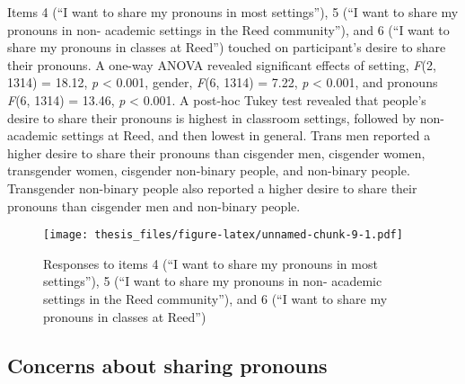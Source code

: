 \documentclass[12pt,twoside]{reedthesis}
\begin{document}
Items 4 (``I want to share my pronouns in most settings''), 5 (``I want to share my pronouns in non- academic settings in the Reed community''), and 6 (``I want to share my pronouns in classes at Reed'') touched on participant's desire to share their pronouns. A one-way ANOVA revealed significant effects of setting, \emph{F}(2, 1314) = 18.12, \emph{p} \textless{} 0.001, gender, \emph{F}(6, 1314) = 7.22, \emph{p} \textless{} 0.001, and pronouns \emph{F}(6, 1314) = 13.46, \emph{p} \textless{} 0.001. A post-hoc Tukey test revealed that people's desire to share their pronouns is highest in classroom settings, followed by non-academic settings at Reed, and then lowest in general. Trans men reported a higher desire to share their pronouns than cisgender men, cisgender women, transgender women, cisgender non-binary people, and non-binary people. Transgender non-binary people also reported a higher desire to share their pronouns than cisgender men and non-binary people.
\begin{figure}
\centering
\texttt{[image: thesis\_files/figure-latex/unnamed-chunk-9-1.pdf]}
\caption{\label{fig:unnamed-chunk-9}Responses to items 4 (``I want to share my pronouns in most settings''), 5 (``I want to share my pronouns in non- academic settings in the Reed community''), and 6 (``I want to share my pronouns in classes at Reed'')}
\end{figure}
\hypertarget{concerns-about-sharing-pronouns}{%
\subsection{Concerns about sharing pronouns}\label{concerns-about-sharing-pronouns}}
\end{document}
